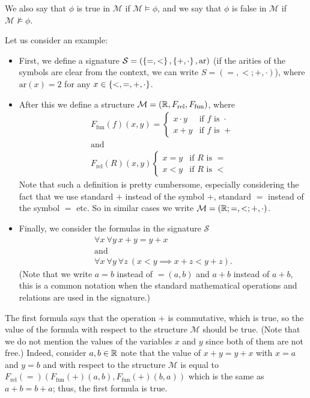 We also say that $\phi$ is true in $\mathcal{M}$ if $\mathcal{M} \models \phi$,
and we say that $\phi$ is false in $\mathcal{M}$ if $\mathcal{M} \not\models \phi$.

Let us consider an example:
\begin{itemize}
  \item First, we define a signature
    $\mathcal{S} = (\set{=, <}, \set{+, \cdot}, \mathrm{ar})$ (if the arities of
    the symbols are clear from the context, we can write $S = (=, <; +, \cdot)$),
    where $\mathrm{ar}(x) = 2$ for any $x \in \set{<, =, +, \cdot}$.
  \item After this we define a structure $\mathcal{M} = (\mathbb{R}, F_\mathrm{rel},
    F_\mathrm{fun})$, where
    \begin{gather*}
      F_\mathrm{fun}(f)(x, y) = \begin{cases}
        x \cdot y & \text{if } f \text{ is } \cdot \\
        x + y & \text{if } f \text{ is } +
      \end{cases} \\
      \text{and} \\
      F_\mathrm{rel}(R)(x, y) \begin{cases}
        x = y & \text{if } R \text{ is } = \\
        x < y & \text{if } R \text{ is } <
      \end{cases}
    \end{gather*}
    Note that such a definition is pretty cumbersome, especially considering the
    fact that we use standard $+$ instead of the symbol $+$,
    standard $=$ instead of the symbol $=$ etc. So in similar cases we
    write $\mathcal{M} = (\mathbb{R}; =, <; +, \cdot)$.
  \item Finally, we consider the formulas in the signature $\mathcal{S}$
    \begin{gather*}
      \forall x \ \forall y \ x + y = y + x \\
      \text{and} \\
      \forall x \ \forall y \ \forall z \ (x < y \implies x + z < y + z).
    \end{gather*}
    (Note that we write $a = b$ instead of $=(a, b)$ and $a + b$ instead of
    $a + b$, this is a common notation when the standard mathematical
    operations and relations are used in the signature.)
\end{itemize}
The first formula says that the operation $+$ is commutative, which is true, so
the value of the formula with respect to the structure $\mathcal{M}$ should be
true. (Note that we do not mention the values of the variables $x$ and $y$
since both of them are not free.) Indeed, consider $a, b \in \mathbb{R}$ note that the
value of $x + y = y + x$ with $x = a$ and $y = b$ and with respect to the
structure $\mathcal{M}$ is equal to $F_\mathrm{rel}(=)(F_\mathrm{fun}(+)(a, b),
F_\mathrm{fun}(+)(b, a))$ which is the same as $a + b = b + a$; thus, the first
formula is true.

